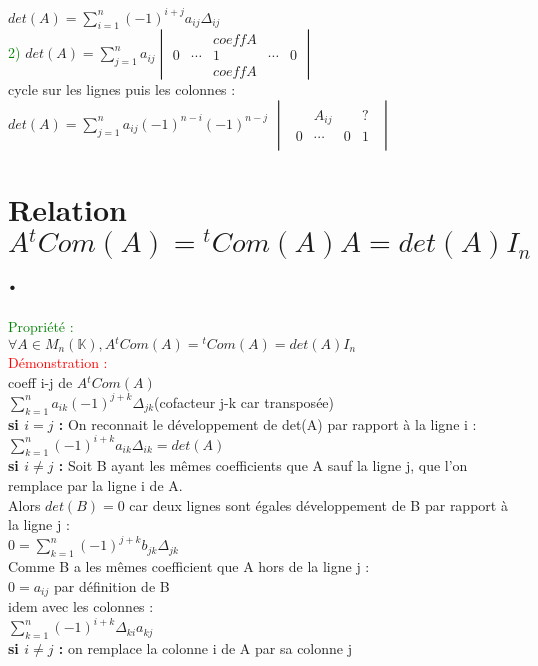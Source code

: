 \documentclass{article}
\begin{document}
    $det(A)=\sum_{i=1}^n (-1)^{i+j} a_{ij} \Delta_{ij}$ \\
    \textcolor{green}{2)} $det(A)= \sum_{j=1}^n a_{ij} \begin{vmatrix} & & coeff A \\ 0 & \cdots & 1 & \cdots &0 \\  & & coeff A \end{vmatrix}$ \\
    cycle sur les lignes puis les colonnes  : \\
    $det(A)=\sum_{j=1}^n a_{ij} (-1)^{n-i}(-1)^{n-j}$ $ \begin{vmatrix} \begin{array}{lcr|r}
      & A_{ij} &  &  ?\\
      \hline 0 & \cdots & 0  & 1
        \end{array} \end{vmatrix}   $
\section{Relation $A {}^tCom(A)={}^tCom(A)A=det(A)I_n$.}
      \textcolor{green}{Propriété :} \\
      $\forall A \in M_n(\mathbb K),  A {}^t Com(A)= {}^t Com(A)= det(A)I_n$ \\
      \textcolor{red}{Démonstration : } \\
      coeff i-j de $A{}^t Com(A)$ \\
      $\sum_{k=1}^n a_{ik} (-1)^{j+k} \Delta_{jk}$(cofacteur j-k car transposée) \\
      {\bf si \boldmath $i = j$ :} On reconnait le développement de det(A) par rapport à la ligne i : \\
      $\sum_{k=1}^n (-1)^{i+k}a_{ik}\Delta_{ik}=det(A)$ \\
      {\bf si \boldmath $i \neq j$ :} Soit B ayant les mêmes coefficients  que A sauf la ligne j, que l'on remplace par la ligne i de A. \\
      Alors $det(B) = 0$ car deux lignes sont égales développement de B par rapport à la ligne j : \\
      $0=\sum_{k=1}^n (-1)^{j+k} b_{jk} \Delta_{jk}$ \\
      Comme B a les mêmes coefficient que A hors de la ligne j : \\
      $0=a_{ij}$ par définition de B \\
      idem avec les colonnes : \\
      $\sum_{k=1}^n (-1)^{i+k} \Delta_{ki} a_{kj}$ \\
      {\bf \boldmath si $i\neq j$ :} on remplace la colonne i de A par sa colonne j
\end{document}
